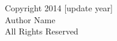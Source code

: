 \vspace*{5cm}
\begin{center}
    Copyright 2014 [update year]\\
    Author Name\\
    All Rights Reserved\\
\end{center}
\setcounter{page}{3}
\thispagestyle{empty}

\clearpage

